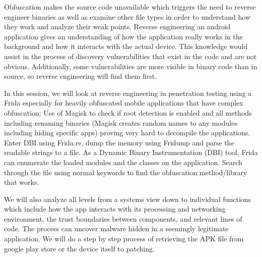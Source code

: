 \def\abstracttitle{Beating a heavily obfuscated app}
\def\abstractcomment{Regular Talk}
\def\abstractowner{Laura Tich and Evelyn Kilel}

\thispagestyle{abstract}

Obfuscation makes the source code unavailable which triggers the need to reverse engineer binaries as well as examine other file types in order to understand how they work and analyze their weak points. Reverse engineering an android application gives an understanding of how the application really works in the background and how it interacts with the actual device. This knowledge would assist in the process of discovery vulnerabilities that exist in the code and are not obvious. Additionally, some vulnerabilities are more visible in binary code than in source, so reverse engineering will find them first.

In this session, we will look at reverse engineering in penetration testing using a Frida especially for heavily obfuscated mobile applications that have complex obfuscation:
Use of Magisk to check if root detection is enabled and all methods including renaming binaries (Magisk creates random names to any modules including hiding specific apps) proving very hard to decompile the applications.
Enter DBI  using Frida.re, dump the memory using Fridump and parse the readable strings to a file. As a Dynamic Binary Instrumentation (DBI) tool, Frida can enumerate the loaded modules and the classes on the application.
Search through the file using normal keywords to find the obfuscation method/library that works.

We will also analyze all levels from a systems view down to individual functions which include how the app interacts with its processing and networking environment, the trust boundaries between components, and relevant lines of code. The process can uncover malware hidden in a seemingly legitimate application. We will do a step by step process of retrieving the APK file from google play store or the device itself to patching.
